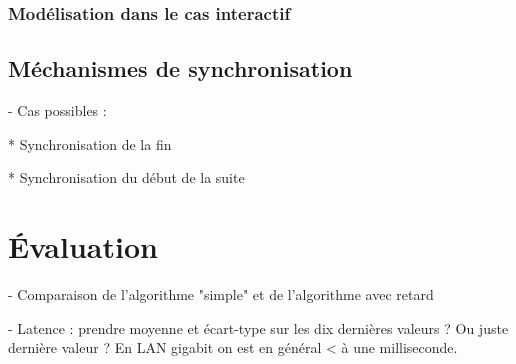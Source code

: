 \documentclass{article}
\begin{document}
\subsubsection{Modélisation dans le cas interactif}

\subsection{Méchanismes de synchronisation}
- Cas possibles : 


* Synchronisation de la fin

* Synchronisation du début de la suite

\section{Évaluation}\label{sec.evaluation}

- Comparaison de l'algorithme "simple" et de l'algorithme avec retard


- Latence : prendre moyenne et écart-type sur les dix dernières valeurs ? Ou juste dernière valeur ?
En LAN gigabit on est en général < à une milliseconde.


\printbibliography 
\end{document}
